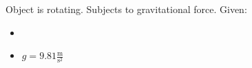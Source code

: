 

Object is rotating. Subjects to gravitational force.
Given: 

\begin{itemize}
    \item 
    \item $ g = 9.81 \frac{\text{m}}{\text{s}^2} $
\end{itemize}
